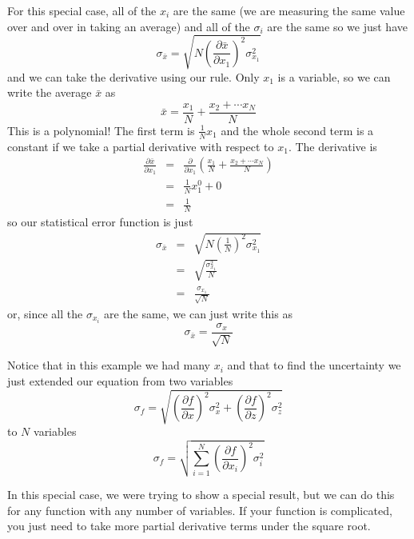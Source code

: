 For this special case, all of the $x_{i}$ are the same (we are measuring the
same value over and over in taking an average) and all of the $\sigma _{i}$
are the same so we just have%
\begin{equation*}
\sigma _{\bar{x}}=\sqrt{N\left( \frac{\partial \bar{x}}{\partial x_{1}}%
\right) ^{2}\sigma _{x_{1}}^{2}}
\end{equation*}%
and we can take the derivative using our rule. Only $x_{1}$ is a variable,
so we can write the average $\bar{x}$ as 
\begin{equation*}
\bar{x}=\frac{x_{1}}{N}+\frac{x_{2}+\cdots x_{N}}{N}
\end{equation*}%
This is a polynomial! The first term is $\frac{1}{N}x_{1}$ and the whole
second term is a constant if we take a partial derivative with respect to $%
x_{1}$. The derivative is 
\begin{eqnarray*}
\frac{\partial \bar{x}}{\partial x_{1}} &=&\frac{\partial }{\partial x_{1}}%
\left( \frac{x_{1}}{N}+\frac{x_{2}+\cdots x_{N}}{N}\right) \\
&=&\frac{1}{N}x_{1}^{0}+0 \\
&=&\frac{1}{N}
\end{eqnarray*}%
so our statistical error function is just 
\begin{eqnarray*}
\sigma _{\bar{x}} &=&\sqrt{N\left( \frac{1}{N}\right) ^{2}\sigma _{x_{1}}^{2}%
} \\
&=&\sqrt{\frac{\sigma _{x_{1}}^{2}}{N}} \\
&=&\frac{\sigma _{x_{1}}}{\sqrt{N}}
\end{eqnarray*}%
or, since all the $\sigma _{x_{i}}$ are the same, we can just write this as%
\begin{equation*}
\sigma _{\bar{x}}=\frac{\sigma _{x}}{\sqrt{N}}
\end{equation*}

Notice that in this example we had many $x_{i}$ and that to find the
uncertainty we just extended our equation from two variables%
\begin{equation*}
\sigma _{f}=\sqrt{\left( \frac{\partial f}{\partial x}\right) ^{2}\sigma
_{x}^{2}+\left( \frac{\partial f}{\partial z}\right) ^{2}\sigma _{z}^{2}}
\end{equation*}%
to $N$ variables%
\begin{equation*}
\sigma _{f}=\sqrt{\sum_{i=1}^{N}\left( \frac{\partial f}{\partial x_{i}}%
\right) ^{2}\sigma _{i}^{2}}
\end{equation*}

In this special case, we were trying to show a special result, but we can do
this for any function with any number of variables. If your function is
complicated, you just need to take more partial derivative terms under the
square root.

